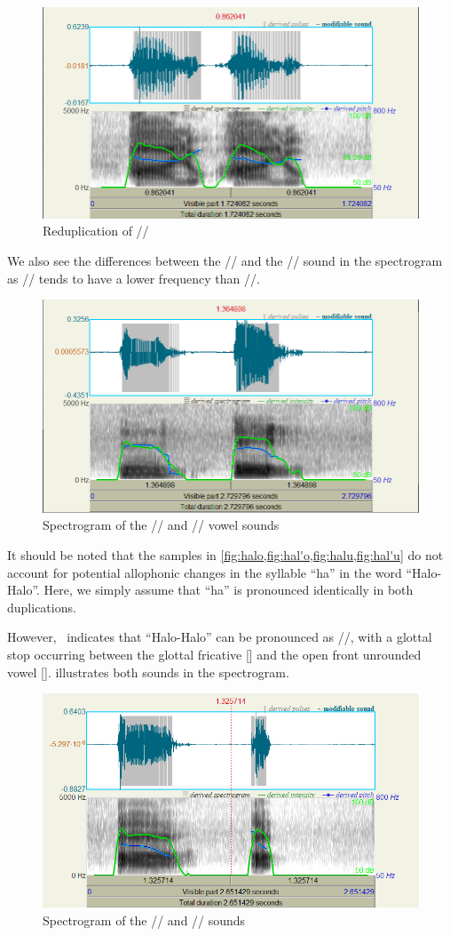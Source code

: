 \documentclass{article}
\begin{document}
\begin{figure}
    \centering
    \includegraphics[width=0.65\linewidth]{img/hal_u.png}
    \caption{Reduplication of //}\label{fig:hal'u}
\end{figure}

We also see the differences between the // and the //
sound in the spectrogram as // tends to have a lower frequency than
//.

\begin{figure}
    \centering
    \includegraphics[width=0.65\linewidth]{img/u-o.png}
    \caption{Spectrogram of the // and // vowel sounds}\label{fig:u-o}
\end{figure}

It should be noted that the samples in
\cref{fig:halo,fig:hal'o,fig:halu,fig:hal'u} do not account for potential
allophonic changes in the syllable ``ha'' in the word ``Halo-Halo''. Here, we
simply assume that ``ha'' is pronounced identically in both duplications.

However,~\cite{KWF2015} indicates that ``Halo-Halo'' can be pronounced as
//, with a glottal stop occurring between the glottal
fricative [] and the open front unrounded vowel [].
 illustrates both sounds in the spectrogram.

\begin{figure}
    \centering
    \includegraphics[width=0.65\linewidth]{img/a-a_.png}
    \caption{Spectrogram of the // and // sounds}\label{fig:a-a'}
\end{figure}
\end{document}
